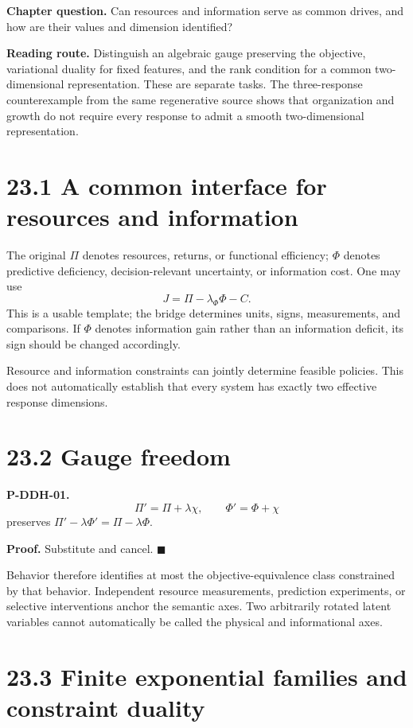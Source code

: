 \documentclass[
  english,
  11pt,
  oneside]{book}
\begin{document}
\textbf{Chapter question.} Can resources and information serve as common drives, and how are their values and dimension identified?

\textbf{Reading route.} Distinguish an algebraic gauge preserving the objective, variational duality for fixed features, and the rank condition for a common two-dimensional representation. These are separate tasks. The three-response counterexample from the same regenerative source shows that organization and growth do not require every response to admit a smooth two-dimensional representation.

\section{23.1 A common interface for resources and information}\label{a-common-interface-for-resources-and-information}

The original \(\Pi\) denotes resources, returns, or functional efficiency; \(\Phi\) denotes predictive deficiency, decision-relevant uncertainty, or information cost. One may use \[J=\Pi-\lambda_\Phi\Phi-C.\] This is a usable template; the bridge determines units, signs, measurements, and comparisons. If \(\Phi\) denotes information gain rather than an information deficit, its sign should be changed accordingly.

Resource and information constraints can jointly determine feasible policies. This does not automatically establish that every system has exactly two effective response dimensions.

\section{23.2 Gauge freedom}\label{gauge-freedom}

\hypertarget{p-ddh-01}{}\label{p-ddh-01}

\textbf{P-DDH-01.} \[\Pi'=\Pi+\lambda\chi,\qquad
\Phi'=\Phi+\chi\] preserves \(\Pi'-\lambda\Phi'=\Pi-\lambda\Phi\).

\textbf{Proof.} Substitute and cancel. \(\blacksquare\)

Behavior therefore identifies at most the objective-equivalence class constrained by that behavior. Independent resource measurements, prediction experiments, or selective interventions anchor the semantic axes. Two arbitrarily rotated latent variables cannot automatically be called the physical and informational axes.

\section{23.3 Finite exponential families and constraint duality}\label{finite-exponential-families-and-constraint-duality}
\end{document}
